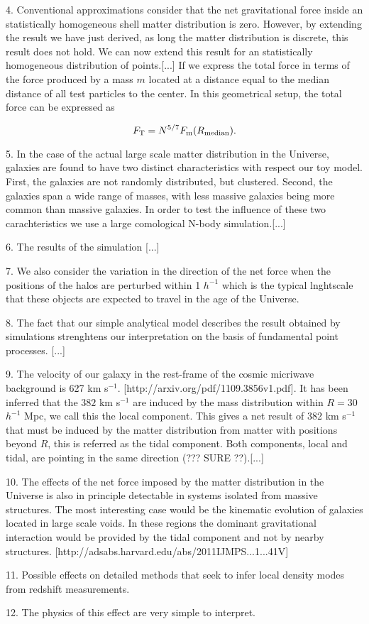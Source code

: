 \documentclass{article}
\begin{document}
4. Conventional approximations consider that the net gravitational force
inside an statistically homogeneous shell matter distribution is
zero. However, by extending the result we have just derived, as long
the matter distribution is discrete, this result does not hold. We can
now extend this result for an statistically homogeneous distribution
of points.[...] If we express the total force in terms of the force
produced by a mass $m$ located at a distance equal to the median
distance of all test particles to the center. In this geometrical
setup, the total force can be expressed as

\begin{equation}
F_{\rm T} = N^{5/7} F_{\rm m}(R_{\rm median}).
\end{equation}

5. In the case of the actual large scale matter distribution in the
Universe, galaxies are found to have two distinct characteristics with
respect our toy model. First, the galaxies are not randomly
distributed, but clustered. Second, the galaxies span a wide range of
masses, with less massive galaxies being more common than massive
galaxies. In order to test the influence of these two carachteristics
we use a large comological N-body simulation.[...]

6. The results of the simulation [...] 

7. We also consider the variation in the direction of the net force
when the positions of the halos are perturbed within 1 $h^{-1}$ which
is the typical lnghtscale that these objects are expected to travel in
the age of the Universe.


8. The fact that our simple analytical model describes the result
obtained by simulations strenghtens our interpretation on the basis of
fundamental point processes. [...]

9. The velocity of our galaxy in the rest-frame of the cosmic
micriwave background is 627 km
s$^{-1}$. [http://arxiv.org/pdf/1109.3856v1.pdf]. It has been inferred
that the $382$ km s$^{-1}$ are induced by the mass distribution within
$R=30$ $h^{-1}$ Mpc, we call this the local component. This gives a
net result of 382 km s$^{-1}$ that must be induced by the matter
distribution from matter with positions beyond $R$, this is referred
as the tidal component.  Both components, local and tidal, are
pointing in the same direction (??? SURE ??).[...]

10. The effects of the net force imposed by the matter distribution
in the Universe is also in principle detectable in systems isolated 
from massive structures. The most interesting case would be the
kinematic evolution of galaxies located in large scale voids. In these
regions the dominant gravitational interaction would be provided by
the tidal component and not by nearby
structures. [http://adsabs.harvard.edu/abs/2011IJMPS...1...41V] 

11. Possible effects on detailed methods that seek to infer local
density modes from redshift measurements. 

12. The physics of this effect are very simple to interpret.
\end{document}
